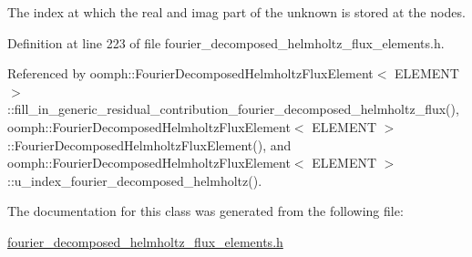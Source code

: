 The index at which the real and imag part of the unknown is stored at the nodes. 



Definition at line 223 of file fourier\+\_\+decomposed\+\_\+helmholtz\+\_\+flux\+\_\+elements.\+h.



Referenced by oomph\+::\+Fourier\+Decomposed\+Helmholtz\+Flux\+Element$<$ E\+L\+E\+M\+E\+N\+T $>$\+::fill\+\_\+in\+\_\+generic\+\_\+residual\+\_\+contribution\+\_\+fourier\+\_\+decomposed\+\_\+helmholtz\+\_\+flux(), oomph\+::\+Fourier\+Decomposed\+Helmholtz\+Flux\+Element$<$ E\+L\+E\+M\+E\+N\+T $>$\+::\+Fourier\+Decomposed\+Helmholtz\+Flux\+Element(), and oomph\+::\+Fourier\+Decomposed\+Helmholtz\+Flux\+Element$<$ E\+L\+E\+M\+E\+N\+T $>$\+::u\+\_\+index\+\_\+fourier\+\_\+decomposed\+\_\+helmholtz().



The documentation for this class was generated from the following file\+:\begin{DoxyCompactItemize}
\item 
\hyperlink{fourier__decomposed__helmholtz__flux__elements_8h}{fourier\+\_\+decomposed\+\_\+helmholtz\+\_\+flux\+\_\+elements.\+h}\end{DoxyCompactItemize}
